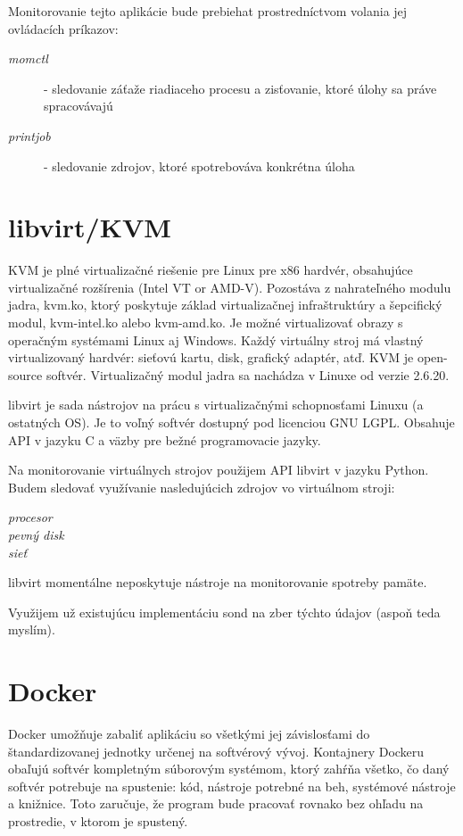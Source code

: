 \documentclass[11pt,final,oneside]{fithesis}
\begin{document}
Monitorovanie tejto aplikácie bude prebiehat prostredníctvom volania jej ovládacích príkazov:
\begin{description}
\item[\emph{momctl}] - sledovanie záťaže riadiaceho procesu a zisťovanie, ktoré úlohy sa práve spracovávajú
\item[\emph{printjob}] - sledovanie zdrojov, ktoré spotrebováva konkrétna úloha 
\end{description}

\section{libvirt/KVM}
KVM\footnotemark{} je plné virtualizačné riešenie pre Linux pre x86 hardvér, obsahujúce virtualizačné rozšírenia (Intel VT or AMD-V).
Pozostáva z nahrateľného modulu jadra, kvm.ko, ktorý poskytuje základ virtualizačnej infraštruktúry a šepcifický modul, kvm-intel.ko alebo kvm-amd.ko. Je možné virtualizovať obrazy 
s operačným systémami Linux aj Windows. Každý virtuálny stroj má vlastný virtualizovaný hardvér: sieťovú kartu, disk, grafický adaptér, atď. KVM je open-source softvér. Virtualizačný modul jadra
sa nachádza v Linuxe od verzie 2.6.20.\cite{torque}

libvirt je sada nástrojov na prácu s virtualizačnými schopnosťami Linuxu (a ostatných OS). Je to voľný softvér dostupný pod licenciou GNU LGPL. 
Obsahuje API v jazyku C a väzby pre bežné programovacie jazyky.\cite{libvirt}

Na monitorovanie virtuálnych strojov použijem API libvirt v jazyku Python. Budem sledovať využívanie nasledujúcich zdrojov vo virtuálnom stroji:
\begin{description}
\item[\emph{procesor}]
\item[\emph{pevný disk}]
\item[\emph{sieť}]
\end{description}

libvirt momentálne neposkytuje nástroje na monitorovanie spotreby pamäte.


Využijem už existujúcu implementáciu sond na zber týchto údajov (aspoň teda myslím).

\section{Docker}
Docker umožňuje zabaliť aplikáciu so všetkými jej závislosťami do štandardizovanej jednotky určenej na softvérový vývoj. Kontajnery Dockeru obaľujú softvér kompletným súborovým systémom, ktorý
zahŕňa všetko, čo daný softvér potrebuje na spustenie: kód, nástroje potrebné na beh, systémové nástroje a knižnice. Toto zaručuje, že program bude pracovať rovnako bez ohľadu na prostredie, v ktorom
je spustený.\cite{docker}
\end{document}
